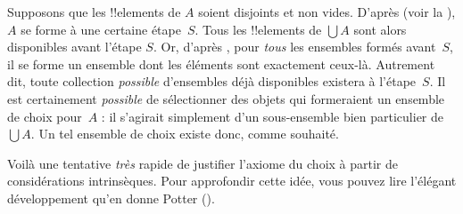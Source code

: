 \documentclass[../../../include/open-logic-section]{subfiles}
\begin{document}
Supposons que les !!{element}s de $A$
soient disjoints et non vides.
D'après \stageshier{}
(voir la ),
$A$ se forme à une certaine étape~$S$.
Tous les !!{element}s de $\bigcup A$
sont alors disponibles avant l'étape
$S$. Or, d'après \stagesacc{},
pour \emph{tous} les ensembles formés
avant~$S$, il se forme un ensemble
dont les éléments sont exactement
ceux-là. Autrement dit, toute
collection \emph{possible}
d'ensembles déjà disponibles existera
à l'étape~$S$. Il est certainement
\emph{possible} de sélectionner
des objets qui formeraient un ensemble
de choix pour~$A$ : il s'agirait
simplement d'un sous-ensemble bien
particulier de $\bigcup A$.
Un tel ensemble de choix existe
donc, comme souhaité.

Voilà une tentative \emph{très}
rapide de justifier l'axiome
du choix à partir de considérations
intrinsèques. Pour approfondir
cette idée, vous pouvez lire
l'élégant développement qu'en donne
Potter (\citeyear[\S14.8]{Potter2004}).
\end{document}
